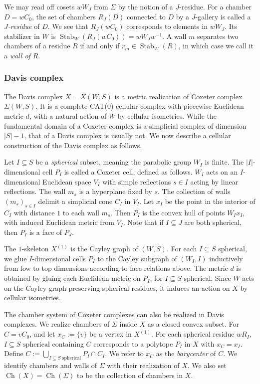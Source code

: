 \documentclass[a4paper, reqno, 14pt]{amsart}
\def\i{{^{-1}}}
\def\subset{\subseteq}
\DeclareMathOperator{\Ch}{Ch}
\DeclareMathOperator{\Stab}{Stab}
\theoremstyle{definition}
\theoremstyle{remark}
\numberwithin{equation}{section}
\numberwithin{thm}{section}
\begin{document}
We may read off cosets $wW_J$ from $\Sigma$ by the notion of a $J$-residue. For a chamber $D=wC_0$, the set of chambers $R_J(D)$ connected to $D$ by a $J$-gallery is called a \emph{$J$-residue} of $D$. We see that $R_J(wC_0)$ corresponds to elements in $wW_J$. Its stabilizer in $W$ is $\Stab_W(R_J(wC_0))=wW_Jw\i$. A wall $m$ separates two chambers of a residue $R$ if and only if $r_m\in \Stab_W(R)$, in which case we call it a \emph{wall of $R$}.



\subsubsection{Davis complex}
The Davis complex $X=X(W,S)$ is a metric realization of Coxeter complex $\Sigma(W,S)$. It is a complete CAT($0$) cellular complex with piecewise Euclidean metric $d$, with a natural action of $W$ by cellular isometries. While the fundamental domain of a Coxeter complex is a simplicial complex of dimension $|S|-1$, that of a Davis complex is usually not. We now describe a cellular construction of the Davis complex as follows. 

Let $I\subset S$ be a \emph{spherical} subset, meaning the parabolic group $W_I$ is finite. The $|I|$-dimensional cell $P_I$ is called a Coxeter cell, defined as follows. $W_I$ acts on an $I$-dimensional Euclidean space $V_I$ with simple reflections $s\in I$ acting by linear reflections. The wall $m_s$ is a hyperplane fixed by $s$. The collection of walls $(m_s)_{s\in I}$ delimit a simplicial cone $C_I$ in $V_I$. Let $x_I$ be the point in the interior of $C_I$ with distance $1$ to each wall $m_s$. Then $P_I$ is the convex hull of points $W_Ix_I$, with induced Euclidean metric from $V_I$. Note that if $I\subset J$ are both spherical, then $P_I$ is a face of $P_J$.

The $1$-skeleton $X^{(1)}$ is the Cayley graph of $(W,S)$. For each $I\subset S$ spherical, we glue $I$-dimensional cells $P_I$ to the Cayley subgraph of $(W_I,I)$ inductively from low to top dimensions according to face relations above. The metric $d$ is obtained by gluing each Euclidean metric on $P_I$, for $I\subset S$ spherical. Since $W$ acts on the Cayley graph preserving spherical residues, it induces an action on $X$ by cellular isometries.

The chamber system of Coxeter complexes can also be realized in Davis complexes. We realize chambers of $\Sigma$ inside $X$ as a closed convex subset. For $C=vC_0$, and let $x_C:=\{v\}$ be a vertex in $X^{(1)}$. For each spherical residue $wR_I$, $I\subset S\text{ spherical}$ containing $C$ corresponds to a polytope $P_I$ in $X$ with $x_C=x_I$. Define $C:=\bigcup_{I\subset S\text{ spherical}} P_I\cap C_I$. We refer to $x_C$ as the \emph{barycenter} of $C$. We identify chambers and walls of $\Sigma$ with their realization of $X$. We also set $\Ch(X)=\Ch(\Sigma)$ to be the collection of chambers in $X$. 
\end{document}
